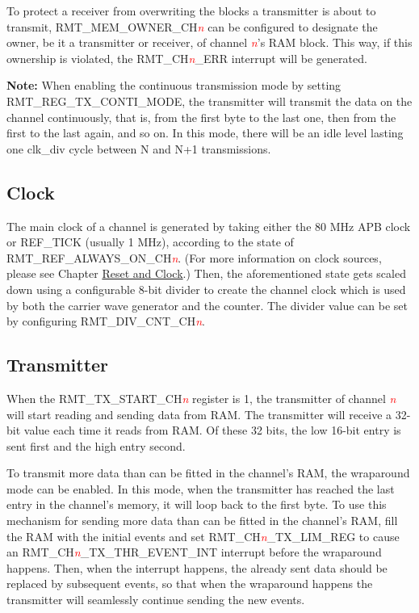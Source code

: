 \documentclass[main\_\_EN.tex]{subfiles}
\begin{document}
To protect a receiver from overwriting the blocks a transmitter is about to transmit, RMT\_MEM\_OWNER\_CH\textcolor{red}{\it{n}} can be configured to designate the owner, be it a transmitter or receiver, of channel \textcolor{red}{\it{n}}’s RAM block. This way, if this ownership is violated, the RMT\_CH\textcolor{red}{\it{n}}\_ERR interrupt will be generated.

{\bfseries Note:} When enabling the continuous transmission mode by setting RMT\_REG\_TX\_CONTI\_MODE, the transmitter will transmit the data on the channel continuously, that is, from the first byte to the last one, then from the first to the last again, and so on. In this mode, there will be an idle level lasting one clk\_div cycle between N and N+1 transmissions.

\subsection{Clock}
The main clock of a channel is generated by taking either the 80 MHz APB clock or REF\_TICK (usually 1 MHz), according to the state of RMT\_REF\_ALWAYS\_ON\_CH\textcolor{red}{\it{n}}. (For more information on clock sources, please see Chapter \hyperref[mod:resclk]{Reset and Clock}.) Then, the aforementioned state gets scaled down using a configurable 8-bit divider to create the channel clock which is used by both the carrier wave generator and the counter. The divider value can be set by configuring RMT\_DIV\_CNT\_CH\textcolor{red}{\it{n}}.

\subsection{Transmitter}\label{rmt:transmitter}
When the RMT\_TX\_START\_CH\textcolor{red}{\it{n}} register is 1, the transmitter of channel \textcolor{red}{\it{n}} will start reading and sending data from RAM. The transmitter will receive a 32-bit value each time it reads from RAM. Of these 32 bits, the low 16-bit entry is sent first and the high entry second.

To transmit more data than can be fitted in the channel's RAM, the wraparound mode can be enabled. In this mode, when the transmitter has reached the last entry in the channel's memory, it will loop back to the first byte. To use this mechanism for sending more data than can be fitted in the channel's RAM, fill the RAM with the initial events and set RMT\_CH\textcolor{red}{\it{n}}\_TX\_LIM\_REG to cause an RMT\_CH\textcolor{red}{\it{n}}\_TX\_THR\_EVENT\_INT interrupt before the wraparound happens. Then, when the interrupt happens, the already sent data should be replaced by subsequent events, so that when the wraparound happens the transmitter will seamlessly continue sending the new events.
\end{document}
